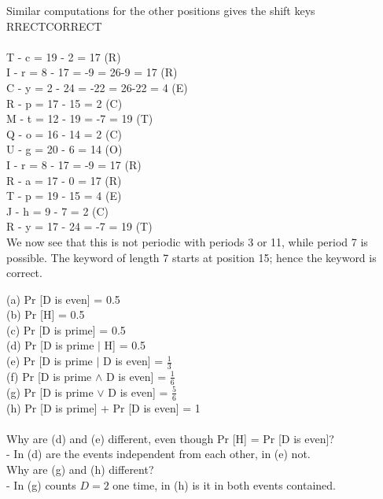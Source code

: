 \documentclass[12pt,a4paper]{article}
\begin{document}
 Similar computations for the other positions gives the shift keys
 RRECTCORRECT\\\\
 T  -  c = 19 -  2 = 17 (R) \\
 I  -  r =  8 - 17 = -9 = 26-9 = 17 (R)\\ 
 C  -  y =  2 - 24 = -22 = 26-22 = 4 (E)\\ 
 R  -  p = 17 - 15 = 2 (C)\\
 M  -  t = 12 - 19 = -7 = 19 (T)\\
 Q  -  o = 16 - 14 = 2 (C)\\
 U  -  g = 20 -  6 = 14 (O)\\
 I  -  r = 8 - 17 = -9 = 17 (R)\\
 R  -  a = 17 - 0 = 17 (R) \\
 T  -  p = 19 - 15 = 4 (E)\\
 J  -  h = 9 - 7 = 2 (C)\\
 R  -  y = 17 - 24 = -7 = 19 (T)\\


 
 We now see that this is not periodic with periods 3 or 11, while period 7 is possible. The keyword
 of length 7 starts at position 15; hence the keyword is
 correct. 


 \exercise
(a) Pr [D is even] = 0.5\\
(b) Pr [H] = 0.5\\
(c) Pr [D is prime] = 0.5\\
(d) Pr [D is prime \(\vert\) H] = 0.5\\
(e) Pr [D is prime \(\vert\) D is even] = \(\frac{1}{3}\)\\
(f) Pr [D is prime \(\land \) D is even] = \(\frac{1}{6}\) \\
(g) Pr [D is prime \(\lor \) D is even] = \(\frac{5}{6}\) \\
(h) Pr [D is prime] + Pr [D is even] = 1\\\\
Why are (d) and (e) different, even though Pr [H] = Pr [D is even]?\\
\indent - In (d) are the events independent from each other, in (e) not.\\
Why are (g) and (h) different?\\
\indent - In (g) counts \(D=2\) one time, in (h) is it in both events contained.

%  
%
%
%  
%
%  
%	
%
%
%
%
%
%
%
%
%
%
\end{document}
